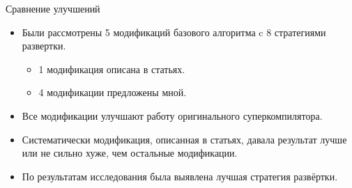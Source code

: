 \documentclass[xcolor=table]{beamer}
\begin{document}
%
\begin{frame}{Сравнение улучшений}

\begin{itemize}
\item Были рассмотрены 5 модификаций базового алгоритма
      c 8 стратегиями развертки.
      \begin{itemize}
      \item 1 модификация описана в статьях.
      \item 4 модификации предложены мной.
      \end{itemize}
\item Все модификации улучшают работу оригинального суперкомпилятора.
\item Систематически модификация, описанная в статьях, давала
      результат лучше или не сильно хуже, чем остальные модификации.
\item По результатам исследования была выявлена
      лучшая стратегия развёртки.
\end{itemize}

\end{frame}
%
\end{document}

